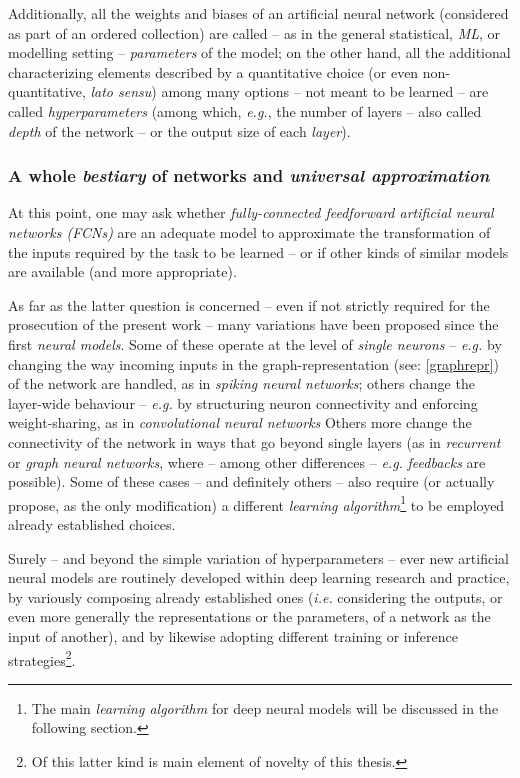 Additionally, all the weights and biases of an artificial neural network (considered as part of an ordered collection) are called -- as in the general statistical, \textit{ML}, or modelling setting -- \textit{parameters} of the model; on the other hand, all the additional characterizing elements described by a quantitative choice (or even non-quantitative, \textit{lato sensu}) among many options -- not meant to be learned -- are called \textit{hyperparameters} (among which, \textit{e.g.}, the number of layers -- also called \textit{depth} of the network -- or the output size of each \textit{layer}).

\subsubsection{A whole \textit{bestiary} of networks and \textit{universal approximation}}

At this point, one may ask whether \textit{fully-connected feedforward artificial neural networks (FCNs)} are an adequate model to approximate the transformation of the inputs required by the task to be learned -- or if other kinds of similar models are available (and more appropriate).

As far as the latter question is concerned -- even if not strictly required for the prosecution of the present work -- many variations have been proposed since the first \textit{neural models}. Some of these operate at the level of \textit{single neurons} -- \textit{e.g.} by changing the way incoming inputs in the graph-representation (see: {\ref{graphrepr}}) of the network are handled, as in \textit{spiking neural networks}; others change the layer-wide behaviour -- \textit{e.g.} by structuring neuron connectivity and enforcing weight-sharing, as in \textit{convolutional neural networks} Others more change the connectivity of the network in ways that go beyond single layers (as in \textit{recurrent} or \textit{graph} \textit{neural networks}, where -- among other differences -- \textit{e.g.} \textit{feedbacks} are possible). Some of these cases -- and definitely others -- also require (or actually propose, as the only modification) a different \textit{learning algorithm}\footnote{The main \textit{learning algorithm} for deep neural models will be discussed in the following section.} to be employed \wrt already established choices.

Surely -- and beyond the simple variation of hyperparameters -- ever new artificial neural models are routinely developed within deep learning research and practice, by variously composing already established ones (\textit{i.e.} considering the outputs, or even more generally the representations or the parameters, of a network as the input of another), and by likewise adopting different training or inference strategies\footnote{Of this latter kind is main element of novelty of this thesis.}.

